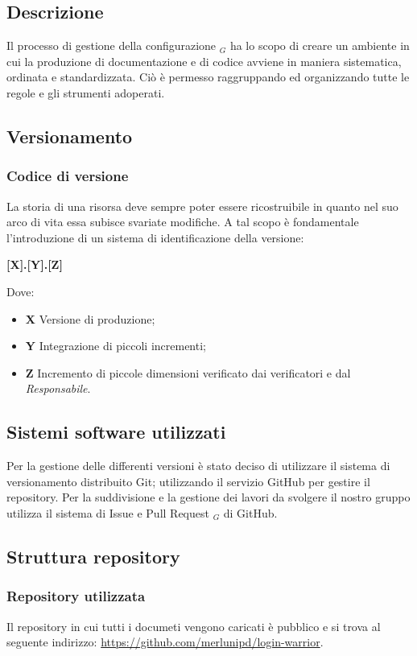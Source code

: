  \subsection{Descrizione}
    Il processo di gestione della configurazione $_G$ ha lo scopo di creare un ambiente in cui la produzione di
    documentazione e di codice avviene in maniera sistematica, ordinata e standardizzata. Ciò è permesso
    raggruppando ed organizzando tutte le regole e gli strumenti adoperati.
 \subsection{Versionamento}
   \subsubsection{Codice di versione}
   La storia di una risorsa deve sempre poter essere ricostruibile in quanto nel suo arco di vita essa subisce
   svariate modifiche. A tal scopo è fondamentale l'introduzione di un sistema di identificazione della
   versione:
   \begin{center}
       \textbf{[X].[Y].[Z]}
   \end{center}
   Dove:
   \begin{itemize}
       \item \textbf{X} Versione di produzione;
       \item \textbf{Y} Integrazione di piccoli incrementi;
       \item \textbf{Z} Incremento di piccole dimensioni verificato dai verificatori e dal \textit{Responsabile}.
   \end{itemize}


 \subsection{Sistemi software utilizzati}
 Per la gestione delle differenti versioni è stato deciso di utilizzare il sistema di versionamento distribuito Git; utilizzando il servizio GitHub per gestire il repository.
 Per la suddivisione e la gestione dei lavori da svolgere il nostro gruppo utilizza il sistema di Issue e Pull Request $_G$ di GitHub.

 \subsection{Struttura repository}
  \subsubsection{Repository utilizzata}
  Il repository in cui tutti i documeti vengono caricati è pubblico e si trova al seguente indirizzo:
  \url{https://github.com/merlunipd/login-warrior}.


